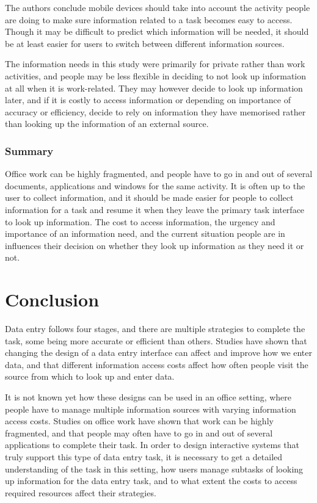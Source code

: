 \documentclass[11pt,oneside]{report}
\begin{document}
The authors conclude mobile devices should take into account the activity people are doing to make sure information related to a task becomes easy to access. Though it may be difficult to predict which information will be needed, it should be at least easier for users to switch between different information sources.

The information needs in this study were primarily for private rather than work activities, and people may be less flexible in deciding to not look up information at all when it is work-related. They may however decide to look up information later, and if it is costly to access information or depending on importance of accuracy or efficiency, decide to rely on information they have memorised rather than looking up the information of an external source. 

\subsubsection{Summary}
Office work can be highly fragmented, and people have to go in and out of several documents, applications and windows for the same activity. It is often up to the user to collect information, and it should be made easier for people to collect information for a task and resume it when they leave the primary task interface to look up information. The cost to access information, the urgency and importance of an information need, and the current situation people are in influences their decision on whether they look up information as they need it or not. 

\section{Conclusion}
Data entry follows four stages, and there are multiple strategies to complete the task, some being more accurate or efficient than others. Studies have shown that changing the design of a data entry interface can affect and improve how we enter data, and that different information access costs affect how often people visit the source from which to look up and enter data.

It is not known yet how these designs can be used in an office setting, where people have to manage multiple information sources with varying information access costs. Studies on office work have shown that work can be highly fragmented, and that people may often have to go in and out of several applications to complete their task. 
In order to design interactive systems that truly support this type of data entry task, it is necessary to get a detailed understanding of the task in this setting, how users manage subtasks of looking up information for the data entry task, and to what extent the costs to access required resources affect their strategies.
\end{document}
